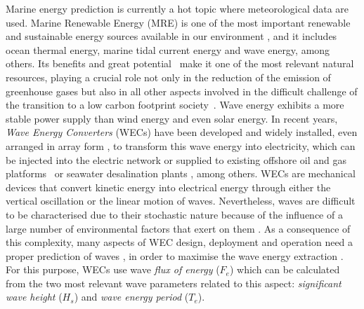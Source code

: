 \documentclass[energies,article,accept,moreauthors,pdftex]{Definitions/mdpi}
\begin{document}
		Marine energy prediction is currently a hot topic where meteorological data are used. Marine Renewable Energy (MRE) is one of the most important renewable and sustainable energy sources available in our environment \cite{en12050787}, and it includes ocean thermal energy, marine tidal current energy and wave energy, among others. Its benefits and great \mbox{potential~\cite{ZEYRINGER20181281}} make it one of the most relevant natural resources, playing a crucial role not only in the reduction of the emission of greenhouse gases but also in all other aspects involved in the difficult challenge of the transition to a low carbon footprint \mbox{society \cite{en12091657, BREDE201344, Alizadeh2020a}}. Wave energy exhibits a more stable power supply than wind energy and even solar energy. In recent years, \textit{Wave Energy Converters} (WECs) \cite{FALCAO2010899} have been developed and widely installed, {even arranged in array form \cite{Amini2020}}, to transform this wave energy into electricity, which can be injected into the electric network or supplied to existing offshore oil and gas \mbox{platforms \cite{OLIVEIRAPINTO2019556}} or seawater desalination plants \cite{FERNANDEZPRIETO2019546}, among others. WECs are mechanical devices that convert kinetic energy into electrical energy through either the vertical oscillation or the linear motion of waves. Nevertheless, waves are difficult to be characterised due to their stochastic nature because of the influence of a large number of environmental factors that exert on them \cite{ochi1998}. As a consequence of this complexity, many aspects of WEC design, deployment and operation \cite{CROWLEY2018159, Abdelkhalik2016, 6898109} need a proper prediction of waves \cite{en11010011, Kaloop2020}, in order to maximise the wave energy extraction \cite{en80910370}. For this purpose, WECs use wave \textit{flux of energy} ($F_e$) which can be calculated from the two most relevant wave parameters related to this aspect: \textit{significant wave height} ($H_s$) and \textit{wave energy period} ($T_e$).
		
\end{document}
